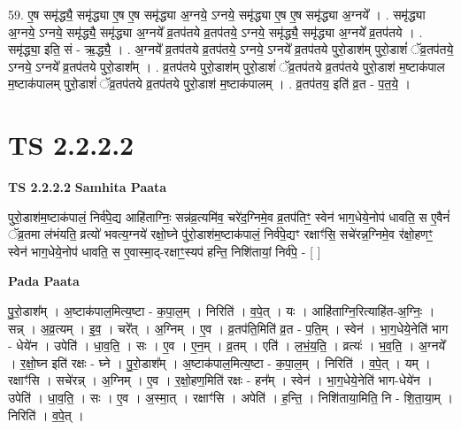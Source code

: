 \documentclass[17pt]{extarticle}
\begin{document}
59. ए॒ष समृ॑द्ध्यै॒ समृ॑द्ध्या ए॒ष ए॒ष समृ॑द्ध्या अ॒ग्नये॒ ऽग्नये॒ समृ॑द्ध्या ए॒ष ए॒ष समृ॑द्ध्या अ॒ग्नये᳚ । . समृ॑द्ध्या अ॒ग्नये॒ ऽग्नये॒ समृ॑द्ध्यै॒ समृ॑द्ध्या अ॒ग्नये᳚ व्र॒तप॑तये व्र॒तप॑तये॒ ऽग्नये॒ समृ॑द्ध्यै॒ समृ॑द्ध्या अ॒ग्नये᳚ व्र॒तप॑तये । . समृ॑द्ध्या॒ इति॒ सं - ऋ॒द्ध्यै॒ । . अ॒ग्नये᳚ व्र॒तप॑तये व्र॒तप॑तये॒ ऽग्नये॒ ऽग्नये᳚ व्र॒तप॑तये पुरो॒डाश॑म् पुरो॒डाशं॑ ॅव्र॒तप॑तये॒ ऽग्नये॒ ऽग्नये᳚ व्र॒तप॑तये पुरो॒डाश᳚म् । . व्र॒तप॑तये पुरो॒डाश॑म् पुरो॒डाशं॑ ॅव्र॒तप॑तये व्र॒तप॑तये पुरो॒डाश॑ म॒ष्टाक॑पाल म॒ष्टाक॑पालम् पुरो॒डाशं॑ ॅव्र॒तप॑तये व्र॒तप॑तये पुरो॒डाश॑ म॒ष्टाक॑पालम् । . व्र॒तप॑तय॒ इति॑ व्र॒त - प॒त॒ये॒ । \newline
\pagebreak
{}
\section*{ TS 2.2.2.2 }

\textbf{TS 2.2.2.2 } \newline
\textbf{Samhita Paata} \newline

पुरो॒डाश॑म॒ष्टाक॑पालं॒ निर्व॑पे॒द्य आहि॑ताग्निः॒ सन्न॑व्र॒त्यमि॑व॒ चरे॑द॒ग्निमे॒व व्र॒तप॑तिꣳ॒॒ स्वेन॑ भाग॒धेये॒नोप॑ धावति॒ स ए॒वैनं॑ ॅव्र॒तमा ल॑भंयति॒ व्रत्यो॑ भवत्य॒ग्नये॑ रक्षो॒घ्ने पु॑रो॒डाश॑म॒ष्टाक॑पालं॒ निर्व॑पे॒द्यꣳ रक्षाꣳ॑सि॒ सचे॑रन्न॒ग्निमे॒व र॑क्षो॒हणꣳ॒॒ स्वेन॑ भाग॒धेये॒नोप॑ धावति॒ स ए॒वास्मा॒द्-रक्षाꣳ॒॒स्यप॑ हन्ति॒ निशि॑तायां॒ निर्व॑पे॒ - [  ] \newline

\textbf{Pada Paata} \newline

पु॒रो॒डाश᳚म् । अ॒ष्टाक॑पाल॒मित्य॒ष्टा - क॒पा॒ल॒म् । निरिति॑ । व॒पे॒त् । यः । आहि॑ताग्नि॒रित्याहि॑त-अ॒ग्निः॒ । सन्न् । अ॒व्र॒त्यम् । इ॒व॒ । चरे᳚त् । अ॒ग्निम् । ए॒व । व्र॒तप॑ति॒मिति॑ व्र॒त - प॒ति॒म् । स्वेन॑ । भा॒ग॒धेये॒नेति॑ भाग - धेये॑न । उपेति॑ । धा॒व॒ति॒ । सः । ए॒व । ए॒न॒म् । व्र॒तम् । एति॑ । ल॒भं॒य॒ति॒ । व्रत्यः॑ । भ॒व॒ति॒ । अ॒ग्नये᳚ । र॒क्षो॒घ्न इति॑ रक्षः - घ्ने । पु॒रो॒डाश᳚म् । अ॒ष्टाक॑पाल॒मित्य॒ष्टा - क॒पा॒ल॒म् । निरिति॑ । व॒पे॒त् । यम् । रक्षाꣳ॑सि । सचे॑रन्न् । अ॒ग्निम् । ए॒व । र॒क्षो॒हण॒मिति॑ रक्षः - हन᳚म् । स्वेन॑ । भा॒ग॒धेये॒नेति॑ भाग-धेये॑न । उपेति॑ । धा॒व॒ति॒ । सः । ए॒व । अ॒स्मा॒त् । रक्षाꣳ॑सि । अपेति॑ । ह॒न्ति॒ । निशि॑ताया॒मिति॒ नि - शि॒ता॒या॒म् । निरिति॑ । व॒पे॒त् ।  \newline
\end{document}
